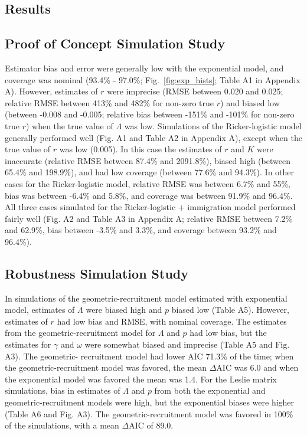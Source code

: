 \documentclass[12pt,english]{article}
\begin{document}
\begin{spacing}{1.9}
\begin{flushleft}
\section*{Results}

\subsection*{Proof of Concept Simulation Study}

Estimator bias and error were generally low with the exponential model, and 
coverage was nominal (93.4\% - 97.0\%; Fig.~\ref{fig:exp_hists}; Table A1 in Appendix A). 
However, estimates of $r$ were 
imprecise (RMSE between 0.020 and 0.025; relative RMSE between 413\% and 
482\% for non-zero true $r$) and biased low (between -0.008 and -0.005; relative bias between
-151\% and -101\% for non-zero true $r$) when the true value of
$\Lambda$ was low. 
Simulations of the Ricker-logistic model 
generally performed well (Fig. A1 and Table A2 in Appendix A), except when the true value of $r$ was low (0.005). In this case the 
estimates of $r$ and $K$ were inaccurate (relative RMSE between 87.4\% and 2091.8\%),
biased high (between 65.4\% and 198.9\%), and had low coverage (between 77.6\% and 94.3\%).
In other cases for the Ricker-logistic model, relative RMSE was between 6.7\%
and 55\%, bias was between -6.4\% and 5.8\%, and coverage was between
91.9\% and 96.4\%.  All three cases simulated for the Ricker-logistic + immigration model 
performed fairly well (Fig. A2 and Table A3 in Appendix A; relative RMSE between 7.2\% 
and 62.9\%, bias between -3.5\% and 3.3\%, and coverage between
93.2\% and 96.4\%).  
  
\subsection*{Robustness Simulation Study}
In simulations of the geometric-recruitment model estimated with exponential model,
estimates of $\Lambda$ were biased high %
and $p$ biased low (Table A5). %
However, estimates of $r$ had low bias %
and RMSE, %
with nominal coverage. %
The estimates from the geometric-recruitment model for $\Lambda$ and $p$ had low bias, but the estimates
for $\gamma$ and $\omega$ were somewhat biased and imprecise (Table A5 and Fig. A3).
The geometric- recruitment model had lower
AIC 71.3\% of the time; when the geometric-recruitment model was favored, the
mean $\Delta$AIC was 6.0 and when the exponential model was favored
the mean was 1.4.  %
For the Leslie matrix simulations, bias in estimates of $\Lambda$ and $p$ from both the exponential and geometric-recruitment models
were high, but the exponential biases were higher (Table A6 and Fig. A3).  
The geometric-recruitment model was favored in 100\% of the simulations, 
with a mean $\Delta$AIC of 89.0.  


\end{flushleft}
\end{spacing}
\end{document}
